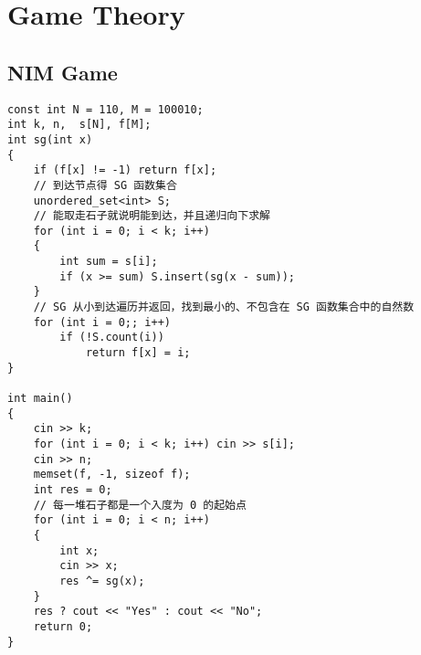 \section{Game Theory}
\subsection{NIM Game}
\begin{lstlisting}
const int N = 110, M = 100010;
int k, n,  s[N], f[M];
int sg(int x)
{
    if (f[x] != -1) return f[x];
    // 到达节点得 SG 函数集合
    unordered_set<int> S;
    // 能取走石子就说明能到达，并且递归向下求解
    for (int i = 0; i < k; i++)
    {
        int sum = s[i];
        if (x >= sum) S.insert(sg(x - sum));
    }
    // SG 从小到达遍历并返回，找到最小的、不包含在 SG 函数集合中的自然数
    for (int i = 0;; i++)
        if (!S.count(i))
            return f[x] = i;
}

int main()
{
    cin >> k;
    for (int i = 0; i < k; i++) cin >> s[i];
    cin >> n;
    memset(f, -1, sizeof f);
    int res = 0;
    // 每一堆石子都是一个入度为 0 的起始点
    for (int i = 0; i < n; i++)
    {
        int x;
        cin >> x;
        res ^= sg(x);
    }
    res ? cout << "Yes" : cout << "No";
    return 0;
}
\end{lstlisting}